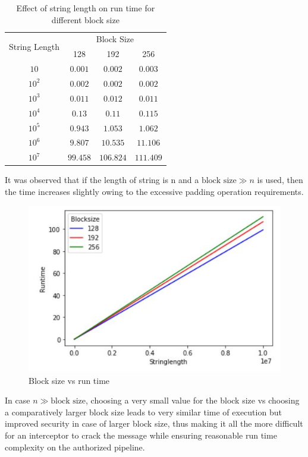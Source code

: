 \begin{table}[htbp]
\caption{Effect of string length on run time for different block size}
\label{tab:3}
\centering
\begin{tabular}{|c|c|c|c|}
\hline
\multirow{2}{1.5cm}{String Length}& \multicolumn{3}{p{3cm}|}{\centering Block Size} \bigstrut \\
\cline{2-4} & \multicolumn{1}{c|}{128} & \multicolumn{1}{c|}{192} & \multicolumn{1}{c|}{256} \bigstrut \\ \hline
$10$ & $0.001$ & $0.002$ & $0.003$\bigstrut\\
$10^2$ & $0.002$ & $0.002$ & $0.002$\bigstrut\\
$10^3$ & $0.011$ & $0.012$ & $0.011$\bigstrut\\
$10^4$ & $0.13$ & $0.11$ & $0.115$\bigstrut\\
$10^5$ & $0.943$ & $1.053$ & $1.062$\bigstrut\\
$10^6$ & $9.807$ & $10.535$ & $11.106$\bigstrut\\
$10^7$ & $99.458$ & $106.824$ & $111.409$\bigstrut\\
\hline
\end{tabular}
\end{table}

\begin{flushleft}
It was observed that if the length of string is n and a $\text{block size}\gg n$ is used, then the time increases slightly owing to the excessive padding operation requirements.
\end{flushleft}

    \begin{figure}[hbt!]
    \centering
        \includegraphics[scale=0.75]{images/fig3.JPG}
        \caption{Block size vs run time}
        \label{fig:3}       %
    \end{figure}
\FloatBarrier
\begin{flushleft}
In case $n\gg \text{block size}$, choosing a very small value for the block size vs choosing a comparatively larger block size leads to very similar time of execution but improved security in case of larger block size, thus making it all the more difficult for an interceptor to crack the message while ensuring reasonable run time complexity on the authorized pipeline.
\end{flushleft}

